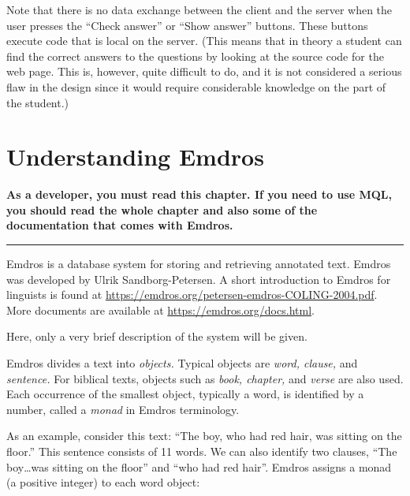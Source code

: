 \documentclass[11pt,oneside,a4paper]{memoir}
\begin{document}
Note that there is no data exchange between the client and the server when the user presses the
``Check answer'' or ``Show answer''%
buttons. These buttons execute code that is local on the server. (This means that in theory a
student can find the correct answers to the questions by looking at the source code for the web
page. This is, however, quite difficult to do, and it is not considered a serious flaw in the design
since it would require considerable knowledge on the part of the student.)


\chapter{Understanding Emdros}\label{chap-emdros-use}

\textbf{As a developer, you must read this chapter. If you need to use MQL, you should read the
  whole chapter and also some of the documentation that comes with Emdros.}

\plainbreak{3}

Emdros is a database system for storing and retrieving annotated text. Emdros was developed by Ulrik
Sandborg-Petersen. A short introduction to Emdros for linguists is
found at \url{https://emdros.org/petersen-emdros-COLING-2004.pdf}. More documents are available at
\url{https://emdros.org/docs.html}.

Here, only a very brief description of the system will be given.

Emdros divides a text into
\emph{objects.} Typical objects are \emph{word, clause,} and
\emph{sentence.} For biblical texts, objects such as \emph{book, chapter,} and \emph{verse} are also
used. Each occurrence of the smallest object, typically a word, is identified by a number, called a
\emph{monad} in Emdros terminology.

As an example, consider this text: ``The boy, who had red hair, was sitting on the floor.'' This
sentence consists of 11 words. We can also identify two clauses, ``The boy\ldots was sitting on the
floor'' and ``who had red hair''. Emdros assigns a monad (a positive integer) to each word object:
\end{document}
